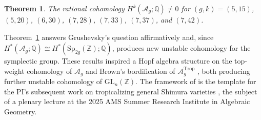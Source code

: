 \documentclass[11pt,reqno]{amsart}
\newtheorem{theorem}[lemma]{Theorem}
\theoremstyle{remark}
\newcommand{\GL}{{GL}}
\newcommand{\HH}{\mathbb{H}}
\newcommand{\QQ}{\mathbb{Q}}
\newcommand{\ZZ}{\mathbb{Z}}
\newcommand{\cA}{\mathcal{A}}
\newcommand{\cM}{\mathcal{M}}
\DeclareMathOperator{\trop}{Trop}
\begin{document}
%

\begin{theorem}\cite[Theorem A]{BBCMMW24}\label{thm:Ag}
The rational cohomology $H^{k}(\cA_{g};\QQ)\neq0$ for $(g,k)=(5,15)$, $(5,20)$, $(6,30)$, $(7,28)$, $(7,33)$, $(7,37)$, and $(7,42)$.
\end{theorem}

Theorem~\ref{thm:Ag} answers Grushevsky's question affirmatively and, since $H^*(\cA_g;\QQ) \cong H^*(\mathrm{Sp}_{2g}(\ZZ);\QQ)$, produces new unstable cohomology for the symplectic group. These results inspired a Hopf algebra structure on the top-weight cohomology of $\cA_{g}$ \cite{BCGP24} and Brown's bordification of $\cA_g^{\trop}$ \cite{Brown23}, both producing further unstable cohomology of $\mathrm{GL}_n(\ZZ)$. The framework of \cite{BBCMMW24} is the template for the PI's subsequent work on tropicalizing general Shimura varieties \cite{ABBCV25}, the subject of a plenary lecture at the 2025 AMS Summer Research Institute in Algebraic Geometry.
 
\end{document}
